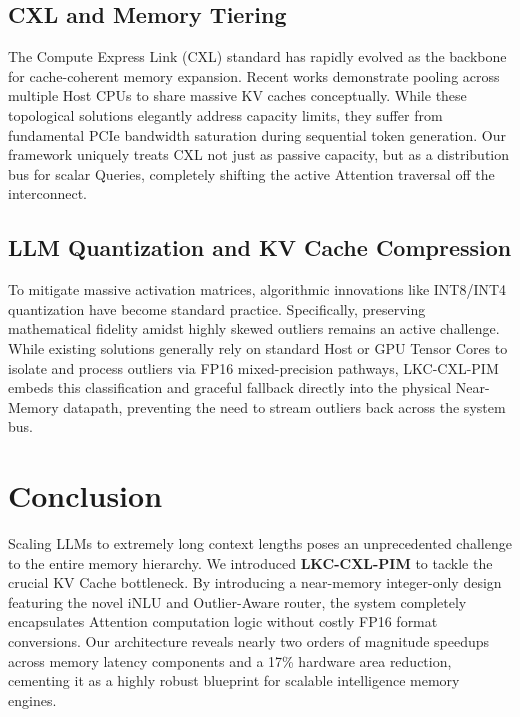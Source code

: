 \documentclass[10pt,conference]{IEEEtran}
\begin{document}
\subsection{CXL and Memory Tiering}
The Compute Express Link (CXL) standard \cite{cxl_standard} has rapidly evolved as the backbone for cache-coherent memory expansion. Recent works \cite{cxl_pond} demonstrate pooling across multiple Host CPUs to share massive KV caches conceptually. While these topological solutions elegantly address capacity limits, they suffer from fundamental PCIe bandwidth saturation during sequential token generation. Our framework uniquely treats CXL not just as passive capacity, but as a distribution bus for scalar Queries, completely shifting the active Attention traversal off the interconnect. 

\subsection{LLM Quantization and KV Cache Compression}
To mitigate massive activation matrices, algorithmic innovations like INT8/INT4 quantization \cite{llm_int8, llm_smoothquant} have become standard practice. Specifically, preserving mathematical fidelity amidst highly skewed outliers \cite{llm_outliers} remains an active challenge. While existing solutions generally rely on standard Host or GPU Tensor Cores to isolate and process outliers via FP16 mixed-precision pathways, LKC-CXL-PIM embeds this classification and graceful fallback directly into the physical Near-Memory datapath, preventing the need to stream outliers back across the system bus.


\section{Conclusion}

Scaling LLMs to extremely long context lengths poses an unprecedented challenge to the entire memory hierarchy. We introduced \textbf{LKC-CXL-PIM} to tackle the crucial KV Cache bottleneck. By introducing a near-memory integer-only design featuring the novel iNLU and Outlier-Aware router, the system completely encapsulates Attention computation logic without costly FP16 format conversions. Our architecture reveals nearly two orders of magnitude speedups across memory latency components and a 17\% hardware area reduction, cementing it as a highly robust blueprint for scalable intelligence memory engines.
\end{document}
